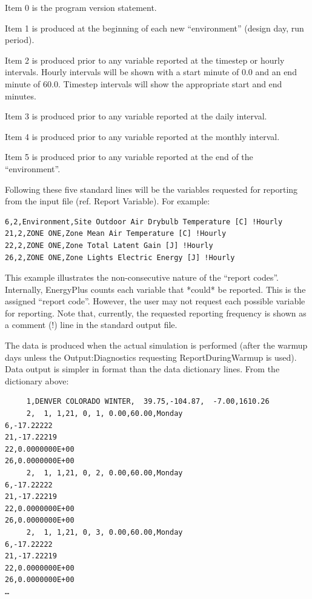 Item 0 is the program version statement.

Item 1 is produced at the beginning of each new “environment” (design day, run period).

Item 2 is produced prior to any variable reported at the timestep or hourly intervals. Hourly intervals will be shown with a start minute of 0.0 and an end minute of 60.0. Timestep intervals will show the appropriate start and end minutes.

Item 3 is produced prior to any variable reported at the daily interval.

Item 4 is produced prior to any variable reported at the monthly interval.

Item 5 is produced prior to any variable reported at the end of the “environment”.

Following these five standard lines will be the variables requested for reporting from the input file (ref. Report Variable). For example:

\begin{lstlisting}
6,2,Environment,Site Outdoor Air Drybulb Temperature [C] !Hourly
21,2,ZONE ONE,Zone Mean Air Temperature [C] !Hourly
22,2,ZONE ONE,Zone Total Latent Gain [J] !Hourly
26,2,ZONE ONE,Zone Lights Electric Energy [J] !Hourly
\end{lstlisting}

This example illustrates the non-consecutive nature of the “report codes”. Internally, EnergyPlus counts each variable that *could* be reported. This is the assigned “report code”. However, the user may not request each possible variable for reporting. Note that, currently, the requested reporting frequency is shown as a comment (!) line in the standard output file.

The data is produced when the actual simulation is performed (after the warmup days unless the Output:Diagnostics requesting ReportDuringWarmup is used). Data output is simpler in format than the data dictionary lines. From the dictionary above:

\begin{lstlisting}
     1,DENVER COLORADO WINTER,  39.75,-104.87,  -7.00,1610.26
     2,  1, 1,21, 0, 1, 0.00,60.00,Monday
6,-17.22222
21,-17.22219
22,0.0000000E+00
26,0.0000000E+00
     2,  1, 1,21, 0, 2, 0.00,60.00,Monday
6,-17.22222
21,-17.22219
22,0.0000000E+00
26,0.0000000E+00
     2,  1, 1,21, 0, 3, 0.00,60.00,Monday
6,-17.22222
21,-17.22219
22,0.0000000E+00
26,0.0000000E+00
…
\end{lstlisting}

